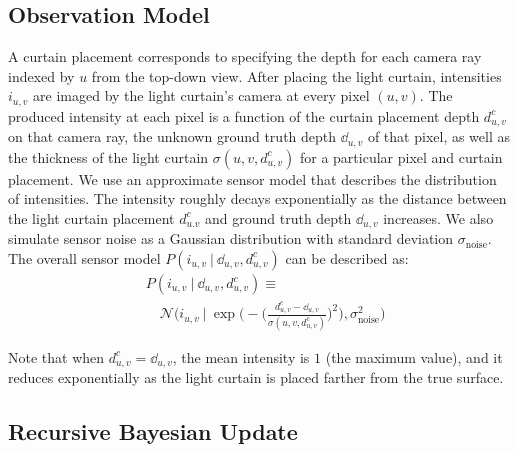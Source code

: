 \subsection{Observation Model}

A curtain placement corresponds to specifying the depth for each camera ray indexed by $u$ from the top-down view. After placing the light curtain, intensities $i_{u,v}$ are imaged by the light curtain's camera at every pixel $(u, v)$. The produced intensity at each pixel is a function of the curtain placement depth $d^c_{u, v}$ on that camera ray, the unknown ground truth depth $\dd_{u, v}$ of that pixel, as well as the thickness of the light curtain $\sigma(u, v, d^c_{u, v})$ for a particular pixel and curtain placement. We use an approximate sensor model that describes the distribution of intensities. The intensity roughly decays exponentially as the distance between the light curtain placement $d^c_{u.v}$ and ground truth depth $\dd_{u, v}$ increases.  We also simulate sensor noise as a Gaussian distribution with standard deviation $\sigma_\text{noise}$. The overall sensor model $P(i_{u, v}\ |\ \dd_{u, v}, d^c_{u, v})$ can be described as:
\begin{align}
   &\nonumber P(i_{u, v}\ |\ \dd_{u, v}, d^c_{u, v}) \equiv\\
   &\quad \mathcal{N} \Big(i_{u, v}\ |\ \exp \Big(-\Bigg(\frac{d^c_{u, v} - \dd_{u, v}}{\sigma(u, v, d^c_{u, v})}\Bigg)^2\Big), \sigma_\text{noise}^2\Big)
   \label{eqn:sensor_model}
\end{align}

Note that when $d^c_{u, v} = \dd_{u, v}$, the mean intensity is $1$ (the maximum value), and it reduces exponentially as the light curtain is placed farther from the true surface.

\subsection{Recursive Bayesian Update}
\newcommand{\qb}{q'}
\newcommand{\before}[1]{{P_\text{prev}(u, v, #1)}}
\newcommand{\after}[1]{{P_\text{next}(u, v, #1)}}

